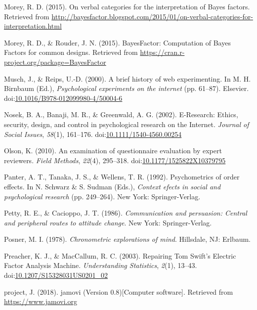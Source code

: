 \documentclass[english,man, mask]{apa6}
\theoremstyle{definition}
\theoremstyle{definition}
\theoremstyle{definition}
\theoremstyle{remark}
\begin{document}
\hypertarget{ref-Morey2015c}{}
Morey, R. D. (2015). On verbal categories for the interpretation of
Bayes factors. Retrieved from
\url{http://bayesfactor.blogspot.com/2015/01/on-verbal-categories-for-interpretation.html}

\hypertarget{ref-Morey2015b}{}
Morey, R. D., \& Rouder, J. N. (2015). BayesFactor: Computation of Bayes
Factors for common designs. Retrieved from
\url{https://cran.r-project.org/package=BayesFactor}

\hypertarget{ref-Musch2000}{}
Musch, J., \& Reips, U.-D. (2000). A brief history of web experimenting.
In M. H. Birnbaum (Ed.), \emph{Psychological experiments on the
internet} (pp. 61--87). Elsevier.
doi:\href{https://doi.org/10.1016/B978-012099980-4/50004-6}{10.1016/B978-012099980-4/50004-6}

\hypertarget{ref-Nosek2002}{}
Nosek, B. A., Banaji, M. R., \& Greenwald, A. G. (2002). E-Research:
Ethics, security, design, and control in psychological research on the
Internet. \emph{Journal of Social Issues}, \emph{58}(1), 161--176.
doi:\href{https://doi.org/10.1111/1540-4560.00254}{10.1111/1540-4560.00254}

\hypertarget{ref-Olson2010}{}
Olson, K. (2010). An examination of questionnaire evaluation by expert
reviewers. \emph{Field Methods}, \emph{22}(4), 295--318.
doi:\href{https://doi.org/10.1177/1525822X10379795}{10.1177/1525822X10379795}

\hypertarget{ref-Panter1992}{}
Panter, A. T., Tanaka, J. S., \& Wellens, T. R. (1992). Psychometrics of
order effects. In N. Schwarz \& S. Sudman (Eds.), \emph{Context efects
in social and psychological research} (pp. 249--264). New York:
Springer-Verlag.

\hypertarget{ref-Petty1986}{}
Petty, R. E., \& Cacioppo, J. T. (1986). \emph{Communication and
persuasion: Central and peripheral routes to attitude change}. New York:
Springer-Verlag.

\hypertarget{ref-Posner1978}{}
Posner, M. I. (1978). \emph{Chronometric explorations of mind}.
Hillsdale, NJ: Erlbaum.

\hypertarget{ref-Preacher2003}{}
Preacher, K. J., \& MacCallum, R. C. (2003). Repairing Tom Swift's
Electric Factor Analysis Machine. \emph{Understanding Statistics},
\emph{2}(1), 13--43.
doi:\href{https://doi.org/10.1207/S15328031US0201_02}{10.1207/S15328031US0201\_02}

\hypertarget{ref-jamovi2018}{}
project, J. (2018). jamovi (Version 0.8){[}Computer software{]}.
Retrieved from \url{https://www.jamovi.org}
\end{document}
